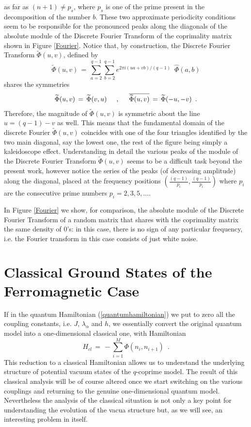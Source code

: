 \documentclass[aps,pra,superscriptaddress]{revtex4}
\newcommand\be            {\begin{equation}}
\newcommand\ee            {\end{equation}}
\renewcommand{\(}{\left(}
\renewcommand{\)}{\right)}
\renewcommand{\[}{\left[}
\renewcommand{\]}{\right]}
\begin{document}
as far as $(n+1) \neq p_s$, where $p_s$ is one of the prime present in the decomposition of the number $b$. These two approximate periodicity conditions seem to be responsible for the pronounced peaks along the diagonals of the absolute module of the Discrete Fourier Transform of the coprimality matrix shown in Figure \ref{Fourier}. Notice that, by construction, the Discrete Fourier Transform $\widetilde \Phi(u,v)$, defined by 
\be 
\widetilde\Phi(u,v) \,=\,\sum_{a=2}^{q-1} \sum_{b=2}^{q-1} e^{2\pi i (u a + v b)/(q-1)} \,\,\,\widehat \Phi(a,b) 
\ee
shares the symmetries 
\be
\widetilde\Phi(u,v) \,=\,\widetilde\Phi(v,u) 
\hspace{5mm}
,
\hspace{5mm}
\overline{\widetilde\Phi(u,v)} \,=\,  \widetilde\Phi(-u, -v) \,\,\,.
\ee
Therefore, the magnitude of $\widetilde\Phi(u,v)$ is symmetric about the line $u = (q-1) - v$ as well. This means that the fundamental domain of the discrete Fourier $\tilde\Phi(u,v)$ coincides with one of the four triangles identified by the two main diagonal, say the lowest one, the rest of the figure being simply a kaleidoscope effect. Understanding in detail the various peaks of the module of the Discrete Fourier Transform $\widetilde\Phi(u,v)$ seems to be a difficult task beyond the present work, however notice the series of the peaks (of decreasing amplitude) along the diagonal, placed at the frequency positions 
$\left(\frac{(q-1)}{p_i},\frac{(q-1)}{p_i}\right)$ where $p_i$ are the consecutive prime numbers $p_i = 2, 3, 5, \ldots $.  

In Figure \ref{Fourier} we show, for comparison, the absolute module of the Discrete Fourier Transform of a random matrix that shares with the coprimality matrix the same density of $0$'s: in this case, there is no sign of any particular frequency, i.e. the Fourier transform in this case consists of just white noise. 

\section{Classical Ground States of the Ferromagnetic Case}
If in the quantum Hamiltonian (\ref{quantumhamiltonian}) we put to zero all the coupling constants, i.e. $J$, $\lambda_\alpha$ and $h$, we 
essentially convert the original quantum model into a one-dimensional classical one, with Hamiltonian 
\be 
H_{cl} \,=\, -\sum_{i=1}^M \Phi(n_i,n_{i+1}) \,\,\,. 
\label{classical}
\ee
This reduction to a classical Hamiltonian allows us to understand the underlying structure of potential vacuum states of the $q$-coprime model. 
The result of this classical analysis will be of course altered once we start switching on the various couplings and returning to the genuine one-dimensional quantum model. Nevertheless the analysis of the classical situation is not only a key point for understanding the evolution of the vacua structure but, as we will see, an interesting problem in itself. 
\end{document}
